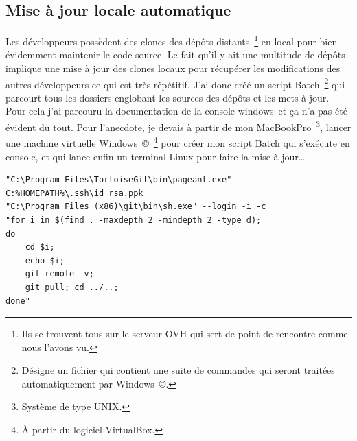 \subsection{Mise à jour locale automatique} %
\label{sub:Mise à jour locale automatique}

Les développeurs possèdent des clones des dépôts distants\, \footnote{Ils se
trouvent tous sur le serveur OVH qui sert de point de rencontre comme nous
l'avons vu.} en local pour bien évidemment maintenir le code source. Le fait
qu'il y ait une multitude de dépôts implique une mise à jour des clones locaux
pour récupérer les modifications des autres développeurs ce qui est très
répétitif. J'ai donc créé un script Batch\, \footnote{Désigne un fichier qui
contient une suite de commandes qui seront traitées automatiquement par
Windows~\copyright.} qui parcourt tous les dossiers englobant les sources des
dépôts et les mets à jour. Pour cela j'ai parcouru la documentation de la
console windows\, et ça n'a pas été évident du tout. Pour l'anecdote, je devais
à partir de mon MacBookPro\, \footnote{Système de type UNIX.}, lancer une
machine virtuelle Windows~\copyright\, \footnote{À partir du logiciel
VirtualBox.} pour créer mon script Batch qui s'exécute en console, et qui lance
enfin un terminal Linux pour faire la mise à jour\dots\\

\begin{lstlisting}[basicstyle=\ttfamily\small, frame=trBL]
"C:\Program Files\TortoiseGit\bin\pageant.exe"
C:%HOMEPATH%\.ssh\id_rsa.ppk
"C:\Program Files (x86)\git\bin\sh.exe" --login -i -c
"for i in $(find . -maxdepth 2 -mindepth 2 -type d);
do
    cd $i;
    echo $i;
    git remote -v;
    git pull; cd ../..;
done"
\end{lstlisting}
